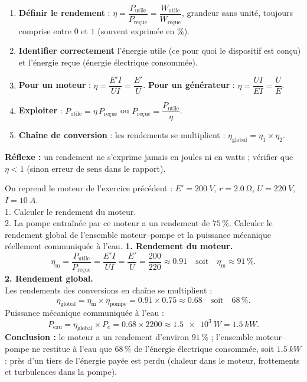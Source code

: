 \documentclass[11pt]{article}
\begin{document}
\begin{methode}
\begin{enumerate}
\item \textbf{Définir le rendement} : $\eta = \dfrac{P_{\text{utile}}}{P_{\text{reçue}}} = \dfrac{W_{\text{utile}}}{W_{\text{reçue}}}$, grandeur sans unité, toujours comprise entre $0$ et $1$ (souvent exprimée en \%). 
\item \textbf{Identifier correctement} l'énergie utile (ce pour quoi le dispositif est conçu) et l'énergie reçue (énergie électrique consommée).
\item \textbf{Pour un moteur} : $\eta = \dfrac{E'I}{UI} = \dfrac{E'}{U}$. \textbf{Pour un générateur} : $\eta = \dfrac{UI}{EI} = \dfrac{U}{E}$.
\item \textbf{Exploiter} : $P_{\text{utile}} = \eta\,P_{\text{reçue}}$ ou $P_{\text{reçue}} = \dfrac{P_{\text{utile}}}{\eta}$.
\item \textbf{Chaîne de conversion} : les rendements se multiplient : $\eta_{\text{global}} = \eta_1 \times \eta_2$.
\end{enumerate}
\textbf{Réflexe :} un rendement ne s'exprime jamais en joules ni en watts ; vérifier que $\eta < 1$ (sinon erreur de sens dans le rapport).
\end{methode}

\begin{exoresolu}
On reprend le moteur de l'exercice précédent : $E' = \SI{200}{V}$, $r = \SI{2,0}{\ohm}$, $U = \SI{220}{V}$, $I = \SI{10}{A}$.\\
1. Calculer le rendement du moteur.\\
2. La pompe entraînée par ce moteur a un rendement de $75\,\%$. Calculer le rendement global de l'ensemble moteur--pompe et la puissance mécanique réellement communiquée à l'eau.
\tcblower
\textbf{1. Rendement du moteur.}\\
\[ \eta_{\text{m}} = \dfrac{P_{\text{utile}}}{P_{\text{reçue}}} = \dfrac{E'I}{UI} = \dfrac{E'}{U} = \dfrac{200}{220} \approx \num{0,91} \quad \text{soit} \quad \eta_{\text{m}} \approx 91\,\%. \]
\textbf{2. Rendement global.}\\
Les rendements des conversions en chaîne se multiplient :
\[ \eta_{\text{global}} = \eta_{\text{m}} \times \eta_{\text{pompe}} = \num{0,91} \times \num{0,75} \approx \num{0,68} \quad \text{soit} \quad 68\,\%. \]
Puissance mécanique communiquée à l'eau :
\[ P_{\text{eau}} = \eta_{\text{global}} \times P_e = \num{0,68} \times 2200 \approx \SI{1,5e3}{W} = \SI{1,5}{kW}. \]
\textbf{Conclusion :} le moteur a un rendement d'environ $91\,\%$ ; l'ensemble moteur--pompe ne restitue à l'eau que $68\,\%$ de l'énergie électrique consommée, soit $\SI{1,5}{kW}$ : près d'un tiers de l'énergie payée est perdu (chaleur dans le moteur, frottements et turbulences dans la pompe).
\end{exoresolu}
\end{document}
